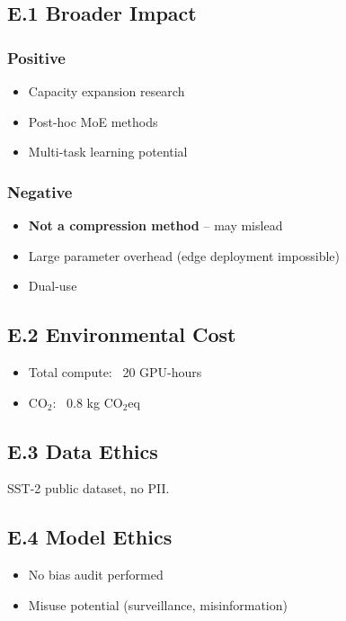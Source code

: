 \subsection{E.1 Broader Impact}

\subsubsection{Positive}
\begin{itemize}
\item Capacity expansion research
\item Post-hoc MoE methods
\item Multi-task learning potential

\end{itemize}
\subsubsection{Negative}
\begin{itemize}
\item \textbf{Not a compression method} -- may mislead
\item Large parameter overhead (edge deployment impossible)
\item Dual-use

\end{itemize}
\subsection{E.2 Environmental Cost}

\begin{itemize}
\item Total compute: ~20 GPU-hours
\item CO$_2$: ~0.8 kg CO$_2$eq

\end{itemize}
\subsection{E.3 Data Ethics}

SST-2 public dataset, no PII.

\subsection{E.4 Model Ethics}

\begin{itemize}
\item No bias audit performed
\item Misuse potential (surveillance, misinformation)

\end{itemize}

